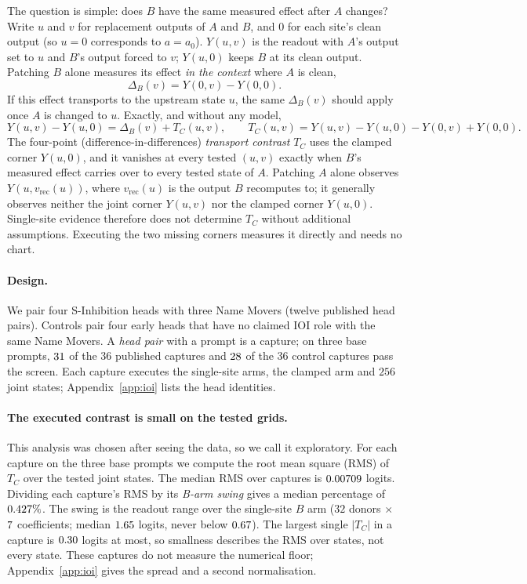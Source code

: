\documentclass{article}
\theoremstyle{plain}
\theoremstyle{definition}
\begin{document}
\begin{tcolorbox}[title={The transport contrast}]
The question is simple: does $B$ have the same measured effect after $A$ changes? Write $u$ and $v$ for replacement
outputs of $A$ and $B$, and $0$ for each site's clean output (so $u=0$ corresponds to $a=a_0$). $Y(u,v)$ is the
readout with $A$'s output set to $u$ and $B$'s output forced to $v$; $Y(u,0)$ keeps $B$ at its clean output. Patching
$B$ alone measures its effect \emph{in the context} where $A$ is clean,
\[
  \Delta_B(v)=Y(0,v)-Y(0,0).
\]
If this effect transports to the upstream state $u$, the same $\Delta_B(v)$ should apply once $A$ is changed to $u$.
Exactly, and without any model,
\[
  Y(u,v)-Y(u,0)=\Delta_B(v)+T_C(u,v),\qquad T_C(u,v)=Y(u,v)-Y(u,0)-Y(0,v)+Y(0,0).
\]
The four-point (difference-in-differences) \emph{transport contrast} $T_C$ uses the clamped corner $Y(u,0)$, and it
vanishes at every tested $(u,v)$ exactly when $B$'s measured effect carries over to every tested state of $A$.
Patching $A$ alone observes $Y(u,v_{\mathrm{rec}}(u))$, where $v_{\mathrm{rec}}(u)$ is the output $B$ recomputes to; it
generally observes neither the joint corner $Y(u,v)$ nor the clamped corner $Y(u,0)$. Single-site evidence therefore
does not determine $T_C$ without additional assumptions. Executing the two missing corners measures it directly and
needs no chart.
\end{tcolorbox}

\paragraph{Design.} We pair four S-Inhibition heads with three Name Movers (twelve published head pairs). Controls
pair four early heads that have no claimed IOI role with the same Name Movers. A \emph{head pair} with a prompt is a
capture; on three base prompts, $31$ of the $36$ published captures and $28$ of the $36$ control captures
pass the screen. Each capture executes the single-site arms, the clamped arm and $256$ joint states;
Appendix~\ref{app:ioi} lists the head identities.

\paragraph{The executed contrast is small on the tested grids.} This analysis was chosen after seeing the data, so we
call it exploratory. For each capture on the three base prompts we compute the root mean square (RMS) of $T_C$ over
the tested joint states. The median RMS over captures is $0.00709$ logits. Dividing each capture's RMS by its
\emph{B-arm swing} gives a median percentage of $0.427\%$. The swing is the readout range over the single-site $B$ arm ($32$ donors $\times$ $7$
coefficients; median $1.65$ logits, never below $0.67$). The largest single $|T_C|$ in a capture is $0.30$
logits at most, so smallness describes the RMS over states, not every state. These captures do not measure the
numerical floor; Appendix~\ref{app:ioi} gives the spread and a second normalisation.
\end{document}
